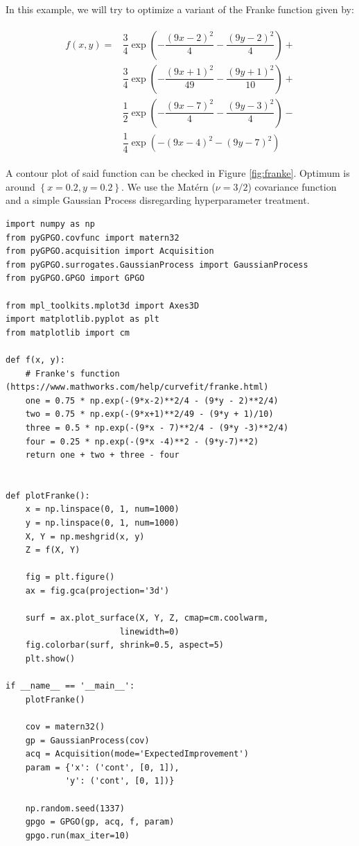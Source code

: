 \documentclass[10pt,a4paper,twoside]{book}
\begin{document}
In this example, we will try to optimize a variant of the Franke function \cite{Franke1980} given by:

\begin{align}
\begin{split}
f(x, y) = &\dfrac{3}{4}\exp\left(-\dfrac{(9x - 2)^2}{4} -\dfrac{(9y - 2)^2}{4}\right)+ \\
&\dfrac{3}{4} \exp\left(-\dfrac{(9x+ 1)^2}{49} -\dfrac{(9y + 1)^2}{10}\right) + \\
&\dfrac{1}{2} \exp\left(-\dfrac{(9x - 7)^2}{4} -\dfrac{(9y - 3)^2}{4}\right) - \\
&\dfrac{1}{4} \exp\left(-(9x - 4)^2 -(9y - 7)^2 \right)
\end{split}
\end{align}


A contour plot of said function can be checked in Figure \ref{fig:franke}. Optimum is around $\left\lbrace x=0.2,y=0.2\right\rbrace$. We use the Matérn ($\nu=3/2$) covariance function and a simple Gaussian Process disregarding hyperparameter treatment.


\begin{verbatim}
import numpy as np
from pyGPGO.covfunc import matern32
from pyGPGO.acquisition import Acquisition
from pyGPGO.surrogates.GaussianProcess import GaussianProcess
from pyGPGO.GPGO import GPGO

from mpl_toolkits.mplot3d import Axes3D
import matplotlib.pyplot as plt
from matplotlib import cm

def f(x, y):
    # Franke's function (https://www.mathworks.com/help/curvefit/franke.html)
    one = 0.75 * np.exp(-(9*x-2)**2/4 - (9*y - 2)**2/4)
    two = 0.75 * np.exp(-(9*x+1)**2/49 - (9*y + 1)/10)
    three = 0.5 * np.exp(-(9*x - 7)**2/4 - (9*y -3)**2/4)
    four = 0.25 * np.exp(-(9*x -4)**2 - (9*y-7)**2)
    return one + two + three - four


def plotFranke():
    x = np.linspace(0, 1, num=1000)
    y = np.linspace(0, 1, num=1000)
    X, Y = np.meshgrid(x, y)
    Z = f(X, Y)
    
    fig = plt.figure()
    ax = fig.gca(projection='3d')

    surf = ax.plot_surface(X, Y, Z, cmap=cm.coolwarm,
                       linewidth=0)
    fig.colorbar(surf, shrink=0.5, aspect=5)
    plt.show()
    
if __name__ == '__main__':
    plotFranke()

    cov = matern32()
    gp = GaussianProcess(cov)
    acq = Acquisition(mode='ExpectedImprovement')
    param = {'x': ('cont', [0, 1]),
            'y': ('cont', [0, 1])}

    np.random.seed(1337)
    gpgo = GPGO(gp, acq, f, param)
    gpgo.run(max_iter=10)
\end{verbatim}
\end{document}
